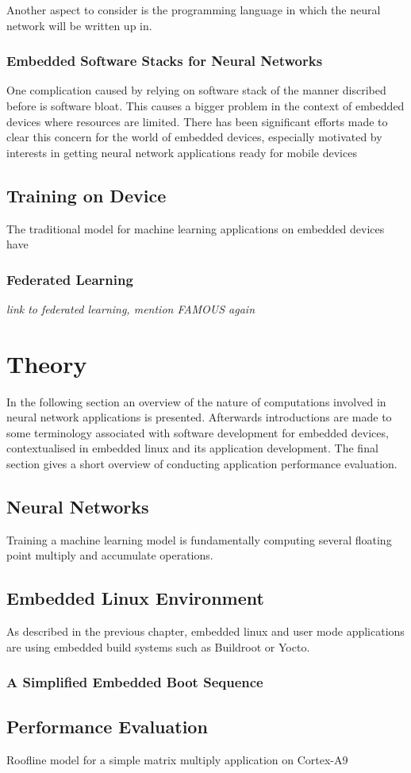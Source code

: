 Another aspect to consider is the programming language in which the neural network will be written up in.

\subsection{Embedded Software Stacks for Neural Networks}

One complication caused by relying on software stack of the manner discribed before is software bloat. This causes a bigger problem in the context of embedded devices where resources are limited. There has been significant efforts made to clear this concern for the world of embedded devices, especially motivated by interests in getting neural network applications ready for mobile devices

\section{Training on Device}

The traditional model for machine learning applications on embedded devices have

\subsection{Federated Learning}

\textit{link to federated learning, mention FAMOUS again}

\chapter{Theory}

In the following section an overview of the nature of computations involved in neural network applications is presented. Afterwards introductions are made to some terminology associated with software development for embedded devices, contextualised in embedded linux and its application development. The final section gives a short overview of conducting application performance evaluation.

\section{Neural Networks}

Training a machine learning model is fundamentally computing several floating point multiply and accumulate operations.

\section{Embedded Linux Environment}

As described in the previous chapter, embedded linux and user mode applications are using embedded build systems such as Buildroot or Yocto.

\subsection{A Simplified Embedded Boot Sequence}

\section{Performance Evaluation}

Roofline model for a simple matrix multiply application on Cortex-A9
